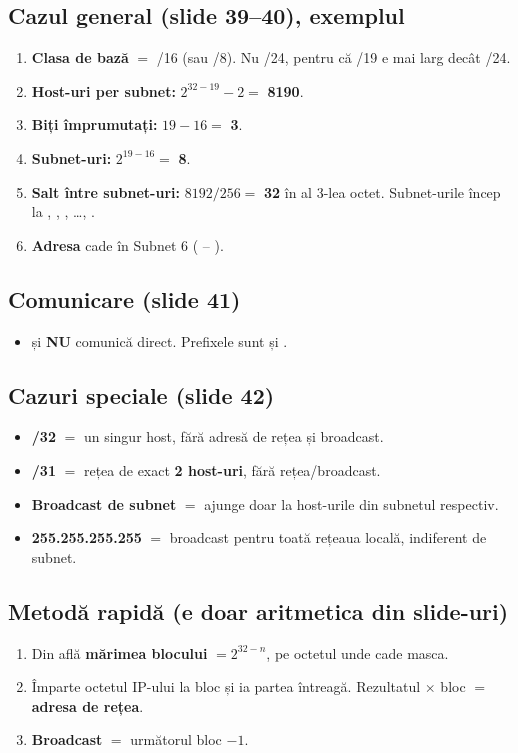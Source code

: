 \documentclass[11pt,a4paper]{article}
\begin{document}
\subsection*{Cazul general (slide 39--40), exemplul }
\begin{enumerate}
  \item \textbf{Clasa de bază} $=$ /16 (sau /8). Nu /24, pentru că /19 e mai larg decât /24.
  \item \textbf{Host-uri per subnet:} $2^{32-19} - 2 = $ \textbf{8190}.
  \item \textbf{Biți împrumutați:} $19 - 16 = $ \textbf{3}.
  \item \textbf{Subnet-uri:} $2^{19-16} = $ \textbf{8}.
  \item \textbf{Salt între subnet-uri:} $8192 / 256 = $ \textbf{32} în al 3-lea octet. Subnet-urile încep la , , , \ldots, .
  \item \textbf{Adresa } cade în Subnet 6 ( -- ).
\end{enumerate}

\subsection*{Comunicare (slide 41)}
\begin{itemize}
  \item {} și  \textbf{NU} comunică direct. Prefixele sunt  și .
\end{itemize}

\subsection*{Cazuri speciale (slide 42)}
\begin{itemize}
  \item \textbf{/32} $=$ un singur host, fără adresă de rețea și broadcast.
  \item \textbf{/31} $=$ rețea de exact \textbf{2 host-uri}, fără rețea/broadcast.
  \item \textbf{Broadcast de subnet} $=$ ajunge doar la host-urile din subnetul respectiv.
  \item \textbf{255.255.255.255} $=$ broadcast pentru toată rețeaua locală, indiferent de subnet.
\end{itemize}

\subsection*{Metodă rapidă (e doar aritmetica din slide-uri)}
\begin{enumerate}
  \item Din  află \textbf{mărimea blocului} $= 2^{32-n}$, pe octetul unde cade masca.
  \item Împarte octetul IP-ului la bloc și ia partea întreagă. Rezultatul $\times$ bloc $=$ \textbf{adresa de rețea}.
  \item \textbf{Broadcast} $=$ următorul bloc $- 1$.
\end{enumerate}
\end{document}

